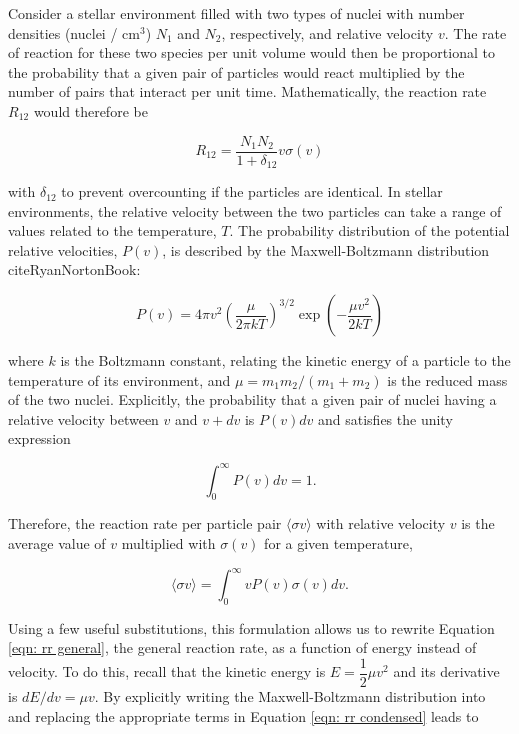 Consider a stellar environment filled with two types of nuclei with number densities (nuclei / cm$^{3}$) $N_{1}$ and $N_{2}$, respectively, and relative velocity $v$. The rate of reaction for these two species per unit volume would then be proportional to the probability that a given pair of particles would react multiplied by the number of pairs that interact per unit time. Mathematically, the reaction rate $R_{12}$ would therefore be

\begin{equation}
R_{12} = \dfrac{N_{1} N_{2}}{1+\delta_{12}} v \sigma (v)
\label{eqn: rr general}
\end{equation}

\noindent with $\delta_{12}$ to prevent overcounting if the particles are identical. In stellar environments, the relative velocity between the two particles can take a range of values related to the temperature, $T$. The probability distribution of the potential relative velocities, $P(v)$, is described by the Maxwell-Boltzmann distribution cite{RyanNortonBook}: 

\begin{equation}
P(v) = 4 \pi v^{2} \left( \dfrac{\mu}{2\pi k T} \right)^{3/2} \exp \left( - \dfrac{\mu v^{2}}{2 k T} \right)
\label{eqn: mb distribution}
\end{equation}

\noindent where $k$ is the Boltzmann constant, relating the kinetic energy of a particle to the temperature of its environment, and $\mu = m_{1}m_{2}/(m_{1}+m_{2})$ is the reduced mass of the two nuclei. Explicitly, the probability that a given pair of nuclei having a relative velocity between $v$ and $v+dv$ is $P(v)dv$ and satisfies the unity expression

\begin{equation}
\int_{0}^{\infty} P(v) dv = 1.
\end{equation}

Therefore, the reaction rate per particle pair $\langle \sigma v \rangle$ with relative velocity $v$ is the average value of $v$ multiplied with $\sigma(v)$ for a given temperature,

\begin{equation}
\langle \sigma v \rangle = \int_{0}^{\infty} v P(v) \sigma(v) dv.
\label{eqn: rr condensed}
\end{equation}

\noindent Using a few useful substitutions, this formulation allows us to rewrite Equation \ref{eqn: rr general}, the general reaction rate, as a function of energy instead of velocity. To do this, recall that the kinetic energy is $E = \dfrac{1}{2} \mu v^{2}$ and its derivative is $dE / dv = \mu v$. By explicitly writing the Maxwell-Boltzmann distribution into and replacing the appropriate terms in Equation \ref{eqn: rr condensed} leads to 

